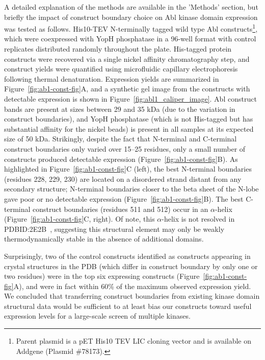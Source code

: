 \documentclass[9pt,lineno]{elife}
\begin{document}
A detailed explanation of the methods are available in the 'Methods' section, but briefly the impact of construct boundary choice on Abl kinase domain expression was tested as follows. His10-TEV N-terminally tagged wild type Abl constructs\footnote{Parent plasmid is a pET His10 TEV LIC cloning vector and is available on Addgene (Plasmid \#78173).}, which were coexpressed with YopH phosphatase in a 96-well format with control replicates distributed randomly throughout the plate.
His-tagged protein constructs were recovered via a single nickel affinity chromatography step, and construct yields were quantified using microfluidic capillary electrophoresis following thermal denaturation. 
Expression yields are summarized in Figure~\ref{fig:ab1-const-fig}A, and a synthetic gel image from the constructs with detectable expression is shown in Figure~\ref{fig:abl1_caliper_image}. 
Abl construct bands are present at sizes between 29 and 35 kDa (due to the variation in construct boundaries), and YopH phosphatase (which is not His-tagged but has substantial affinity for the nickel beads) is present in all samples at its expected size of 50 kDa. 
Strikingly, despite the fact that N-terminal and C-terminal construct boundaries only varied over 15--25 residues, only a small number of constructs produced detectable expression (Figure~\ref{fig:ab1-const-fig}B). 
As highlighted in Figure~\ref{fig:ab1-const-fig}C (left), the best N-terminal boundaries (residues 228, 229, 230) are located on a disordered strand distant from any secondary structure; N-terminal boundaries closer to the beta sheet of the N-lobe gave poor or no detectable expression (Figure~\ref{fig:ab1-const-fig}B). 
The best C-terminal construct boundaries (residues 511 and 512) occur in an $\alpha$-helix (Figure~\ref{fig:ab1-const-fig}C, right). 
Of note, this $\alpha$-helix is not resolved in PDBID:2E2B~\citep{Horio:2007wo}, suggesting this structural element may only be weakly thermodynamically stable in the absence of additional domains.

Surprisingly, two of the control constructs identified as constructs appearing in crystal structures in the PDB (which differ in construct boundary by only one or two residues) were in the top six expressing constructs (Figure~\ref{fig:ab1-const-fig}A), and were in fact within 60\% of the maximum observed expression yield.
We concluded that transferring construct boundaries from existing kinase domain structural data would be sufficient to at least bias our constructs toward useful expression levels for a large-scale screen of multiple kinases. 
\end{document}
